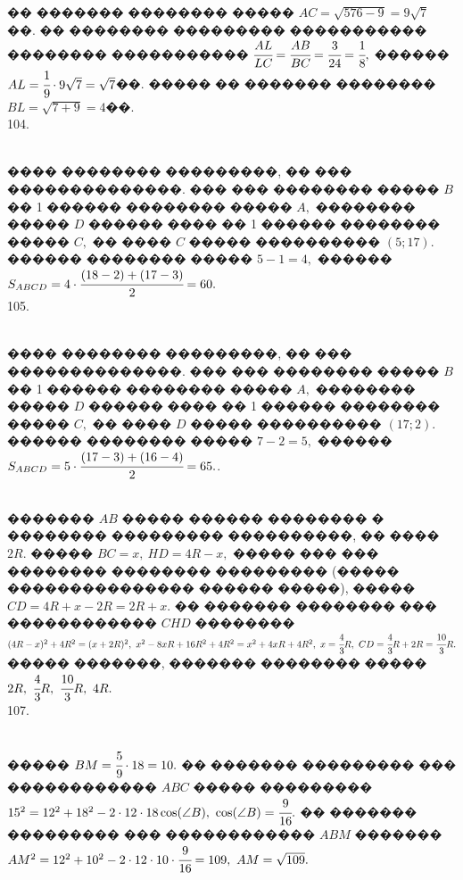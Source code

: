 \documentclass[12pt]{article}
\begin{document}
�� ������� �������� ����� $AC=\sqrt{576-9}=9\sqrt{7}$��. �� �������� ��������� ����������� �������� ����������� $\cfrac{AL}{LC}=\cfrac{AB}{BC}=\cfrac{3}{24}=\cfrac{1}{8},$ ������ $AL=\cfrac{1}{9}\cdot9\sqrt{7}=\sqrt{7}$��. �����  �� ������� �������� $BL=\sqrt{7+9}=4$��.\\
104. \begin{figure}[ht!]
\end{figure}\\
���� �������� ���������, �� ��� ��������������. ��� ��� �������� ����� $B$ �� 1 ������ �������� ����� $A,$ �������� ����� $D$ ������ ���� �� 1 ������ �������� ����� $C,$ �� ���� $C$ ����� ���������� $(5;17).$ ������ �������� ����� $5-1=4,$ ������ $S_{ABCD}=4\cdot\cfrac{(18-2)+(17-3)}{2}=60.$\\
105. \begin{figure}[ht!]
\end{figure}\\
���� �������� ���������, �� ��� ��������������. ��� ��� �������� ����� $B$ �� 1 ������ �������� ����� $A,$ �������� ����� $D$ ������ ���� �� 1 ������ �������� ����� $C,$ �� ���� $D$ ����� ���������� $(17;2).$ ������ �������� ����� $7-2=5,$ ������ $S_{ABCD}=5\cdot\cfrac{(17-3)+(16-4)}{2}=65.$\newpage{}. \begin{figure}[ht!]
\end{figure}\\
������� $AB$ ����� ������ �������� � �������� ��������� ����������, �� ���� $2R.$ ����� $BC=x,\ HD=4R-x,$ ����� ��� ��� �������� �������� ��������� (����� ��������������� ������ �����), ����� $CD=4R+x-2R=2R+x.$ �� ������� �������� ��� ������������ $CHD$ �������� $(4R-x)^2+4R^2=(x+2R)^2,\
x^2-8xR+16R^2+4R^2=x^2+4xR+4R^2,\ x=\cfrac{4}{3}R,\ CD=\cfrac{4}{3}R+2R=\cfrac{10}{3}R.$ ����� �������,
������� �������� ����� $2R,\ \cfrac{4}{3}R,\ \cfrac{10}{3}R,\ 4R.$\\
107. \begin{figure}[ht!]
\end{figure}\\
����� $BM=\cfrac{5}{9}\cdot18=10.$ �� ������� ��������� ��� ������������ $ABC$ ����� ��������� $15^2=12^2+18^2-2\cdot12\cdot18\cos(\angle B),\ \cos(\angle B)=\cfrac{9}{16}.$ �� ������� ��������� ��� ������������ $ABM$ ������� $AM^2=12^2+10^2-2\cdot12\cdot10\cdot\cfrac{9}{16}=109,\ AM=\sqrt{109}.$\\
\end{document}
